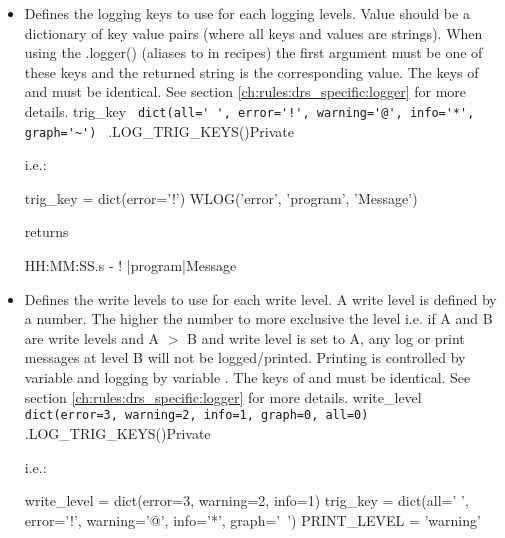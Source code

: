 \begin{itemize}
\item {}
\begin{minipage}[t]{\textwidth}
{Defines the logging keys to use for each logging levels. Value should be a dictionary of key value pairs (where all keys and values are strings). When using the \spirouLog.logger() (aliases to \WLOG in recipes) the first argument must be one of these keys and the returned string is the corresponding value. The keys of  and  must be identical. See section \ref{ch:rules:drs_specific:logger} for more details.}
{trig\_key}
{\lstinline[style=pythoninline]| dict(all=' ', error='!', warning='@', info='*', graph='~') |}
{\AllRecipes}{\spirouConst.LOG\_TRIG\_KEYS()}{\AllRecipes}{Private}
\vspace{-0.25cm}
\begin{thighlight}
i.e.: 
\begin{pythonbox}
trig_key = dict(error='!')
WLOG('error', 'program', 'Message')
\end{pythonbox}
returns
\begin{cmdboxprint}
HH:MM:SS.s - ! |program|Message
\end{cmdboxprint}
\end{thighlight}
\end{minipage}
\fi

\ifdevguide

\item {}
\begin{minipage}[t]{\textwidth}
{Defines the write levels to use for each write level. A write level is defined by a number. The higher the number to more exclusive the level i.e. if A and B are write levels and A $>$ B and write level is set to A, any log or print messages at level B will not be logged/printed. Printing is controlled by variable  and logging by variable . The keys of  and  must be identical. See section \ref{ch:rules:drs_specific:logger} for more details.}
{write\_level}
{\lstinline[style=pythoninline]| dict(error=3, warning=2, info=1, graph=0, all=0) |}
{\AllRecipes}{\spirouConst.LOG\_TRIG\_KEYS()}{\AllRecipes}{Private}
\vspace{-0.25cm}
\begin{thighlight}
i.e.: 
\begin{pythonbox}
write_level = dict(error=3, warning=2, info=1)
trig_key = dict(all=' ', error='!', warning='@', info='*', graph='~')
PRINT_LEVEL = 'warning'


\end{pythonbox}
\end{thighlight}
\end{minipage}
\end{itemize}
